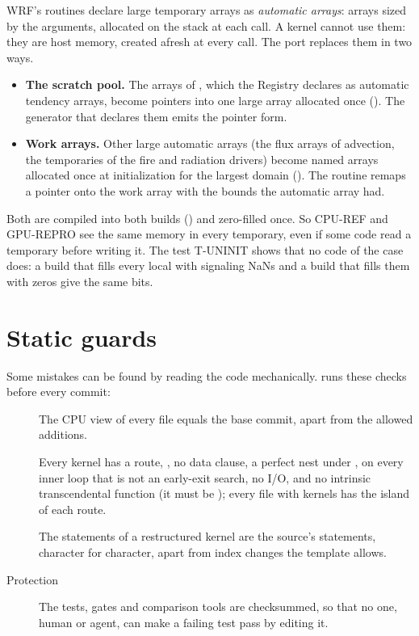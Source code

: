 WRF's routines declare large temporary arrays as \emph{automatic arrays}: arrays sized by the arguments, allocated on
the stack at each call. A kernel cannot use them: they are host memory, created afresh at every call. The port
replaces them in two ways.
\begin{itemize}
  \item \textbf{The scratch pool.} The  arrays of , which the Registry declares as automatic
    tendency arrays, become pointers into one large array allocated once (). The
    generator that declares them emits the pointer form.
  \item \textbf{Work arrays.} Other large automatic arrays (the flux arrays of advection, the temporaries of the fire
    and radiation drivers) become named arrays allocated once at initialization for the largest domain
    (). The routine remaps a pointer onto the work array with the bounds the automatic
    array had.
\end{itemize}
Both are compiled into both builds () and zero-filled once. So CPU-REF and GPU-REPRO see the same
memory in every temporary, even if some code read a temporary before writing it. The test T-UNINIT shows that no code
of the case does: a build that fills every local with signaling NaNs and a build that fills them with zeros give the
same bits.

\section{Static guards}

Some mistakes can be found by reading the code mechanically.  runs these checks before
every commit:
\begin{description}
  \item[] The CPU view of every file equals the base commit, apart from the allowed additions.
  \item[] Every kernel has a route, , no data clause, a perfect nest under
    ,  on every inner loop that is not an early-exit search, no I/O, and no intrinsic
    transcendental function (it must be ); every file with kernels has the island of each route.
  \item[] The statements of a restructured kernel are the source's statements, character for
    character, apart from index changes the template allows.
  \item[Protection] The tests, gates and comparison tools are checksummed, so that no one, human or agent, can make a
    failing test pass by editing it.
\end{description}

